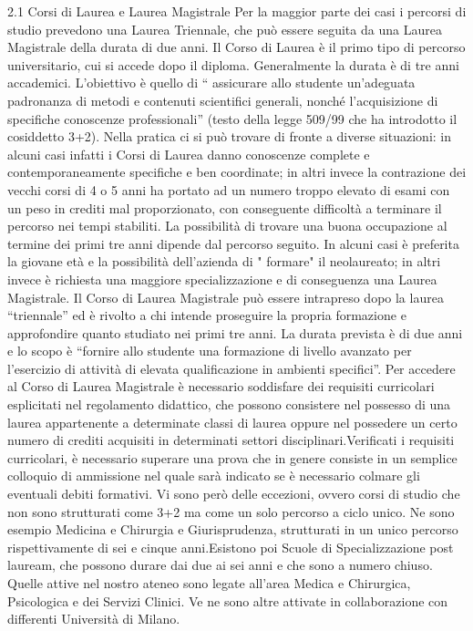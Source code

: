 2.1 Corsi di Laurea e Laurea Magistrale
Per la maggior parte dei casi i percorsi di studio prevedono una Laurea Triennale, che può essere seguita da una Laurea Magistrale della durata di due anni. Il Corso di Laurea è il primo tipo di percorso universitario, cui si accede dopo il diploma. Generalmente la durata è di tre anni accademici.
L’obiettivo è quello di “ assicurare allo studente un’adeguata padronanza di metodi e contenuti scientifici generali, nonché l’acquisizione di specifiche conoscenze professionali” (testo della legge 509/99 che ha introdotto il cosiddetto 3+2).
Nella pratica ci si può trovare di fronte a diverse situazioni: in alcuni casi infatti i Corsi di Laurea danno conoscenze complete e contemporaneamente specifiche e ben coordinate; in altri invece la contrazione dei vecchi corsi di 4 o 5 anni ha portato ad un numero troppo elevato di esami con un peso in crediti mal proporzionato, con  conseguente difficoltà a terminare il percorso nei tempi stabiliti. 
La possibilità di trovare una buona occupazione al termine dei primi tre anni dipende dal percorso seguito. In alcuni casi è preferita la giovane età e la possibilità dell'azienda di " formare" il neolaureato; in altri invece è richiesta una maggiore specializzazione e di conseguenza una Laurea Magistrale.
Il Corso di Laurea Magistrale può essere intrapreso dopo la laurea “triennale” ed è rivolto a chi intende proseguire la propria formazione e approfondire quanto studiato nei primi tre anni. La durata prevista è di due anni e lo scopo è “fornire allo studente una formazione di livello avanzato per l’esercizio di attività di elevata qualificazione in ambienti specifici”.
Per accedere al Corso di Laurea Magistrale è necessario soddisfare dei requisiti curricolari esplicitati nel regolamento didattico, che possono consistere nel possesso di una laurea appartenente a determinate classi di laurea oppure nel possedere un certo numero di crediti acquisiti in determinati settori disciplinari.Verificati i requisiti curricolari, è necessario superare una prova  che in genere consiste in un semplice colloquio di ammissione nel quale sarà indicato se è necessario colmare gli eventuali debiti formativi.
Vi sono però delle eccezioni, ovvero corsi di studio che non sono strutturati come 3+2 ma come un solo percorso a ciclo unico. Ne sono esempio Medicina e Chirurgia e Giurisprudenza, strutturati in un unico percorso rispettivamente di sei e cinque anni.Esistono poi Scuole di Specializzazione post lauream, che possono durare dai due ai sei anni e che sono a numero chiuso. Quelle attive nel nostro ateneo sono legate all’area Medica e Chirurgica, Psicologica e dei Servizi Clinici. Ve ne sono altre attivate in collaborazione con differenti Università di Milano.
